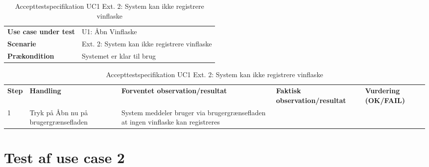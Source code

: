 \begin{table}[H]
	\centering
	\caption{Accepttestspecifikation UC1 Ext. 2: System kan ikke registrere vinflaske}
	\label{ATUC1:Ext2}
	\begin{tabular}{ p{80pt}  p{320pt} }\hline
		\rowcolor{white}	
		\textbf{Use case under test} & U1: Åbn Vinflaske \\
		\rowcolor{lightgray}
		\textbf{Scenarie} & Ext. 2: System kan ikke registrere vinflaske \\\rowcolor{white}	
		\textbf{Prækondition} &
		Systemet er klar til brug \\
		\hline
	\end{tabular}
	\begin{tabular}{  p{26pt} p{100pt}  p{101pt} | p{67pt} | p{68pt}}
		\textbf{Step} & \textbf{Handling} & \textbf{Forventet observation/resultat} & \textbf{Faktisk observation/resultat} & \textbf{Vurdering (OK/FAIL)}\\
		1 & Tryk på Åbn nu på
		brugergrænsefladen & System meddeler bruger
		via brugergrænsefladen
		at ingen vinflaske kan
		registreres &  &  \\
		\hline
	\end{tabular}
\end{table}

\section{Test af use case 2}

